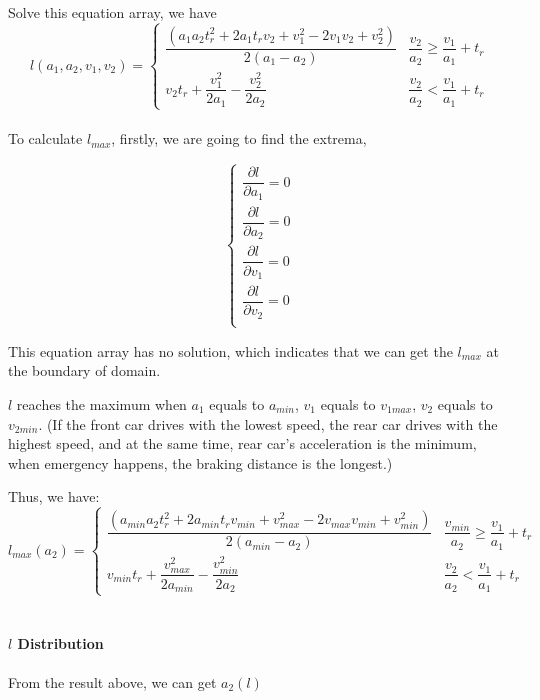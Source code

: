 Solve this equation array, we have
\begin{displaymath}
l(a_1, a_2, v_1, v_2) = 
\left \{
\begin{array}{cl}
\dfrac{(a_1a_2t_r^2 + 2a_1t_rv_2 + v_1^2 - 2v_1v_2 + v_2^2)}{2(a_1-a_2)} & \dfrac{v_2}{a_2}  \geq \dfrac{v_1}{a_1} + t_r \\
v_2 t_r + \dfrac{v_1 ^ 2}{2a_1} -\dfrac{v_2^2}{2a_2} & \dfrac{v_2}{a_2}  < \dfrac{v_1}{a_1} + t_r
\end{array}
\right .
\end{displaymath}
\\

To calculate $l_{max}$, firstly, we are going to find the extrema,

\begin{displaymath}
\left \{
\begin{array}{cl}
\dfrac{\partial l}{\partial{a_1}} = 0 \\
\dfrac{\partial l}{\partial{a_2}} = 0 \\
\dfrac{\partial l}{\partial{v_1}} = 0 \\
\dfrac{\partial l}{\partial{v_2}} = 0 \\
\end{array}
\right .
\end{displaymath}

This equation array has no solution, which indicates that we can get the $l_{max}$ at the boundary of domain.

$l$ reaches the maximum when $a_1$ equals to $a_{min}$, { }$v_1$ equals to $v_{1max}$, $v_2$ equals to $v_{2min}$. (If the front car drives with the lowest speed, the rear car drives with the highest speed, and at the same time, rear car's acceleration is the minimum, when emergency happens, the braking distance is the longest.)

Thus, we have:
\begin{displaymath}
l_{max}(a_2) = 
\left \{
\begin{array}{cl}
\dfrac{(a_{min}a_2t_r^2 + 2a_{min}t_rv_{min} + v_{max}^2 - 2v_{max}v_{min} + v_{min}^2)}{2(a_{min}-a_2)} & \dfrac{v_{min}}{a_2}  \geq \dfrac{v_1}{a_1} + t_r \\
v_{min} t_r + \dfrac{v_{max} ^ 2}{2a_{min}} -\dfrac{v_{min}^2}{2a_2} & \dfrac{v_2}{a_2}  < \dfrac{v_1}{a_1} + t_r
\end{array}
\right .
\end{displaymath}\\

\paragraph{$l${ } Distribution}
From the result above, we can get $a_2(l)$

